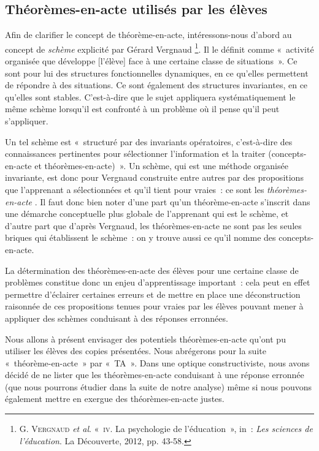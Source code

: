 \documentclass{report}
\theoremstyle{definition}
\newcommand{\tas}{théorèmes-en-acte }
\begin{document}
\subsection*{Théorèmes-en-acte utilisés par les élèves}

Afin de clarifier le concept de théorème-en-acte, intéressons-nous d'abord au concept de \textit{schème} explicité par Gérard Vergnaud \footnote{G. \textsc{Vergnaud} \textit{et al}. «~\textsc{iv}. La psychologie de l'éducation~», in~: \textit{Les sciences de l’éducation}. La Découverte, 2012, pp. 43-58.}. Il le définit comme «~activité organisée que développe [l'élève] face à une certaine classe de situations~». Ce sont pour lui des structures fonctionnelles dynamiques, en ce qu'elles permettent de répondre à des situations. Ce sont également des structures invariantes, en ce qu'elles sont stables. C'est-à-dire que le sujet appliquera systématiquement le même schème lorsqu'il est confronté à un problème où il pense qu'il peut s'appliquer.

Un tel schème est «~structuré par des invariants opératoires, c'est-à-dire des connaissances pertinentes pour sélectionner l'information et la traiter (concepts-en-acte et théorèmes-en-acte)~». Un schème, qui est une méthode organisée invariante, est donc pour Vergnaud construite entre autres par des propositions que l'apprenant a sélectionnées et qu'il tient pour vraies~: ce sont les \textit{\tas}. Il faut donc bien noter d'une part qu'un théorème-en-acte s'inscrit dans une démarche conceptuelle plus globale de l'apprenant qui est le schème, et d'autre  part que d'après Vergnaud, les théorèmes-en-acte ne sont pas les seules briques qui établissent le schème~: on y trouve aussi ce qu'il nomme des concepts-en-acte.

La détermination des \tas des élèves pour une certaine classe de problèmes constitue donc un enjeu d'apprentissage important~: cela peut en effet permettre d'éclairer certaines erreurs et de mettre en place une déconstruction raisonnée de ces propositions tenues pour vraies par les élèves pouvant mener à appliquer des schèmes conduisant à des réponses erronnées.

Nous allons à présent envisager des potentiels \tas qu'ont pu utiliser les élèves des copies présentées. Nous abrégerons pour la suite «~théorème-en-acte~» par «~TA~». Dans une optique constructiviste, nous avons décidé de ne lister que les \tas conduisant à une réponse erronnée (que nous pourrons étudier dans la suite de notre analyse) même si nous pouvons également mettre en exergue des \tas justes.
\end{document}
